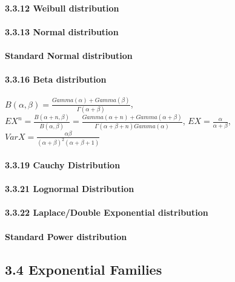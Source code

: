 \documentclass[6pt,Portrait]{article}
\let\oldparagraph\paragraph
\renewcommand{\paragraph}[1]{\oldparagraph{#1}\mbox{}}
\begin{document}
\hypertarget{Weib}{%
\paragraph{3.3.12 Weibull distribution}\label{Weib}}

\hypertarget{Norm}{%
\paragraph{3.3.13 Normal distribution}\label{Norm}}

\hypertarget{SNorm}{%
\paragraph{Standard Normal distribution}\label{SNorm}}

\hypertarget{Beta}{%
\paragraph{3.3.16 Beta distribution}\label{Beta}}

\(B(\alpha,\beta)=\frac{Gamma(\alpha)+Gamma(\beta)}{\Gamma(\alpha+\beta)}\),
\(EX^n=\frac{B(\alpha+n,\beta)}{B(\alpha,\beta)}=\frac{Gamma(\alpha+n)+Gamma(\alpha+\beta)}{\Gamma(\alpha+\beta+n)Gamma(\alpha)}\),
\(EX=\frac{\alpha} {\alpha+\beta}\),
\(VarX=\frac{\alpha\beta}{(\alpha+\beta)^2(\alpha+\beta+1)}\)

\hypertarget{Cauchy}{%
\paragraph{3.3.19 Cauchy Distribution}\label{Cauchy}}

\hypertarget{LNorm}{%
\paragraph{3.3.21 Lognormal Distribution}\label{LNorm}}

\hypertarget{Laplace}{%
\paragraph{3.3.22 Laplace/Double Exponential
distribution}\label{Laplace}}

\hypertarget{SPower}{%
\paragraph{Standard Power distribution}\label{SPower}}

\hypertarget{exponential-families}{%
\subsection{3.4 Exponential Families}\label{exponential-families}}
\end{document}
